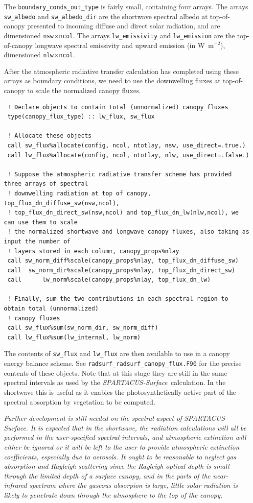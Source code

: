 \documentclass[a4,oneside]{article}
\def\codesize{\small}
\def\spsurf{\emph{SPARTACUS-Surface}}
\def\code#1{{\codesize\texttt{#1}}}
\begin{document}
The \code{boundary\_conds\_out\_type} is fairly small, containing four
arrays. The arrays \code{sw\_albedo} and \code{sw\_albedo\_dir} are
the shortwave spectral albedo at top-of-canopy presented to incoming
diffuse and direct solar radiation, and are dimensioned
\code{nsw}$\times$\code{ncol}. The arrays \code{lw\_emissivity} and
\code{lw\_emission} are the top-of-canopy longwave spectral emissivity
and upward emission (in W~m$^{-2}$), dimensioned
\code{nlw}$\times$\code{ncol}.

After the atmospheric radiative transfer calculation has completed
using these arrays as boundary conditions, we need to use the
downwelling fluxes at top-of-canopy to scale the normalized canopy
fluxes. 
\begin{lstlisting}
 ! Declare objects to contain total (unnormalized) canopy fluxes
 type(canopy_flux_type) :: lw_flux, sw_flux

 ! Allocate these objects
 call sw_flux%allocate(config, ncol, ntotlay, nsw, use_direct=.true.)
 call lw_flux%allocate(config, ncol, ntotlay, nlw, use_direct=.false.)

 ! Suppose the atmospheric radiative transfer scheme has provided three arrays of spectral
 ! downwelling radiation at top of canopy, top_flux_dn_diffuse_sw(nsw,ncol),
 ! top_flux_dn_direct_sw(nsw,ncol) and top_flux_dn_lw(nlw,ncol), we can use them to scale
 ! the normalized shortwave and longwave canopy fluxes, also taking as input the number of
 ! layers stored in each column, canopy_props%nlay
 call sw_norm_diff%scale(canopy_props%nlay, top_flux_dn_diffuse_sw)
 call  sw_norm_dir%scale(canopy_props%nlay, top_flux_dn_direct_sw)
 call      lw_norm%scale(canopy_props%nlay, top_flux_dn_lw)

 ! Finally, sum the two contributions in each spectral region to obtain total (unnormalized)
 ! canopy fluxes
 call sw_flux%sum(sw_norm_dir, sw_norm_diff)
 call lw_flux%sum(lw_internal, lw_norm)
\end{lstlisting}
The contents of \code{sw\_flux} and \code{lw\_flux} are then available
to use in a canopy energy balance scheme.  See
\code{radsurf\_radsurf\_canopy\_flux.F90} for the precise contents of
these objects. Note that at this stage they are still in the same
spectral intervals as used by the \spsurf\ calculation.  In the
shortwave this is useful as it enables the photosynthetically active
part of the spectral absorption by vegetation to be computed.

\emph{Further development is still needed on the spectral aspect of
  \spsurf.  It is expected that in the shortwave, the radiation
  calculations will all be performed in the user-specified spectral
  intervals, and atmospheric extinction will either be ignored or it
  will be left to the user to provide atmospheric extinction
  coefficients, especially due to aerosols. It ought to be reasonable
  to neglect gas absorption and Rayleigh scattering since the Rayleigh
  optical depth is small through the limited depth of a surface
  canopy, and in the parts of the near-infrared spectrum where the
  gaseous absorpion is large, little solar radiation is likely to
  penetrate down through the atmosphere to the top of the canopy.}
\end{document}
